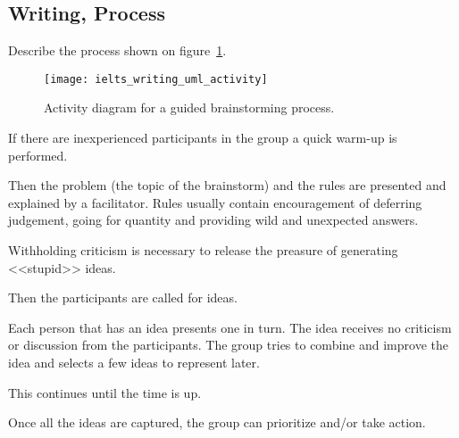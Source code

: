 \subsection*{Writing, Process}
Describe the process shown on figure~\ref{fig:ielts_writing_uml_activity}.

\begin{figure}[H]
  \centering
    \texttt{[image: ielts\_writing\_uml\_activity]}
  \caption{Activity diagram for a guided brainstorming process.}
  \label{fig:ielts_writing_uml_activity}
\end{figure}

\begin{answer}
If there are inexperienced participants in the group a quick warm-up is performed.

Then the problem (the topic of the brainstorm) and the rules are presented and explained by a facilitator.
Rules usually contain encouragement of deferring judgement, going for quantity and providing wild and unexpected answers.

Withholding criticism is necessary to release the preasure of generating <<stupid>> ideas.

Then the participants are called for ideas. 

Each person that has an idea presents one in turn. 
The idea receives no criticism or discussion from the participants.
The group tries to combine and improve the idea and selects a few ideas to represent later.

This continues until the time is up.

Once all the ideas are captured, the group can prioritize and/or take action.
\end{answer}
